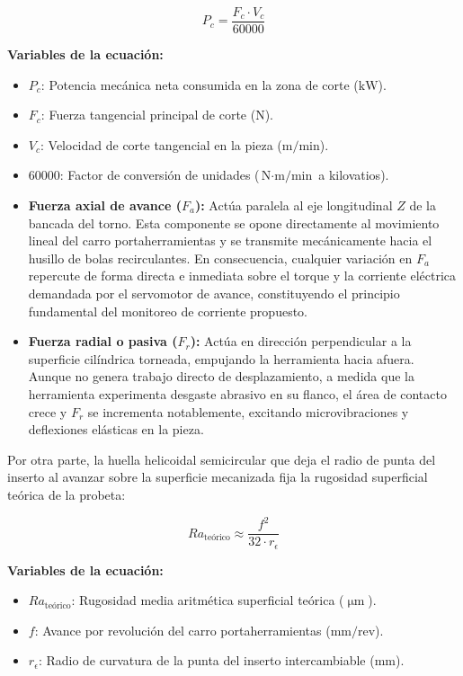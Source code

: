 \begin{equation}
P_c = \frac{F_c \cdot V_c}{60000}
\label{eq:potencia_corte}
\end{equation}

\noindent\textbf{Variables de la ecuación:}
\begin{itemize}
    \item $P_c$: Potencia mecánica neta consumida en la zona de corte ($\text{kW}$).
    \item $F_c$: Fuerza tangencial principal de corte ($\text{N}$).
    \item $V_c$: Velocidad de corte tangencial en la pieza ($\text{m/min}$).
    \item $60000$: Factor de conversión de unidades ($\text{N}\cdot\text{m/min}$ a kilovatios).
\end{itemize}

\begin{itemize}
    \item \textbf{Fuerza axial de avance ($F_a$):} Actúa paralela al eje longitudinal $Z$ de la bancada del torno. Esta componente se opone directamente al movimiento lineal del carro portaherramientas y se transmite mecánicamente hacia el husillo de bolas recirculantes. En consecuencia, cualquier variación en $F_a$ repercute de forma directa e inmediata sobre el torque y la corriente eléctrica demandada por el servomotor de avance, constituyendo el principio fundamental del monitoreo de corriente propuesto.
    \item \textbf{Fuerza radial o pasiva ($F_r$):} Actúa en dirección perpendicular a la superficie cilíndrica torneada, empujando la herramienta hacia afuera. Aunque no genera trabajo directo de desplazamiento, a medida que la herramienta experimenta desgaste abrasivo en su flanco, el área de contacto crece y $F_r$ se incrementa notablemente, excitando microvibraciones y deflexiones elásticas en la pieza.
\end{itemize}

Por otra parte, la huella helicoidal semicircular que deja el radio de punta del inserto al avanzar sobre la superficie mecanizada fija la rugosidad superficial teórica de la probeta:

\begin{equation}
Ra_{\text{teórico}} \approx \frac{f^2}{32 \cdot r_\epsilon}
\label{eq:rugosidad_teorica}
\end{equation}

\noindent\textbf{Variables de la ecuación:}
\begin{itemize}
    \item $Ra_{\text{teórico}}$: Rugosidad media aritmética superficial teórica ($\upmu\text{m}$).
    \item $f$: Avance por revolución del carro portaherramientas ($\text{mm/rev}$).
    \item $r_\epsilon$: Radio de curvatura de la punta del inserto intercambiable ($\text{mm}$).
\end{itemize}

